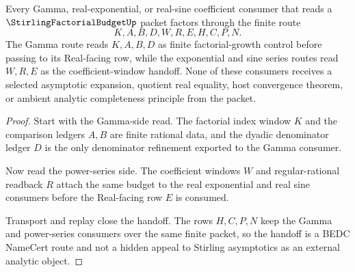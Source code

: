 \begin{theorem}
\label{thm:stirling-factorial-budget-gamma-series-handoff}
Every Gamma, real-exponential, or real-sine coefficient consumer that reads a $\StirlingFactorialBudgetUp$ packet factors through the finite route
$$
K,A,B,D,W,R,E,H,C,P,N .
$$
The Gamma route reads $K,A,B,D$ as finite factorial-growth control before passing to its Real-facing row, while the exponential and sine series routes read $W,R,E$ as the coefficient-window handoff. None of these consumers receives a selected asymptotic expansion, quotient real equality, host convergence theorem, or ambient analytic completeness principle from the packet.
\end{theorem}
\begin{proof}
Start with the Gamma-side read. The factorial index window $K$ and the comparison ledgers $A,B$ are finite rational data, and the dyadic denominator ledger $D$ is the only denominator refinement exported to the Gamma consumer.

Now read the power-series side. The coefficient windows $W$ and regular-rational readback $R$ attach the same budget to the real exponential and real sine consumers before the Real-facing row $E$ is consumed.

Transport and replay close the handoff. The rows $H,C,P,N$ keep the Gamma and power-series consumers over the same finite packet, so the handoff is a BEDC NameCert route and not a hidden appeal to Stirling asymptotics as an external analytic object.
\end{proof}




